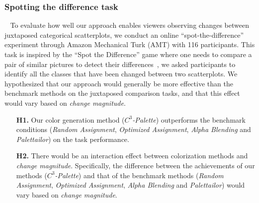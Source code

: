 {\subsubsection{Spotting the difference task}
\
\newline
To evaluate how well our approach enables viewers observing changes between juxtaposed categorical scatterplots, we conduct an online ``spot-the-difference'' experiment through Amazon Mechanical Turk (AMT) with 116 participants.
This task is inspired by the ``Spot the Difference'' game where one needs to compare a pair of similar pictures to detect their differences~\cite{Fukuba2009}, we asked participants to identify all the classes that have been changed between two scatterplots.
\vspace{.3em}
 We hypothesized that our approach would generally be more effective than the benchmark methods on the juxtaposed comparison tasks, and that this effect would vary based on \emph{change magnitude}.
\begin{itemize}[noitemsep]
\setlength{\itemsep}{5pt}
    \item[\textbf{H1.}] Our color generation method (\emph{$C^3$-Palette}) outperforms the benchmark conditions (\emph{Random Assignment}, \emph{Optimized Assignment}, \emph{Alpha Blending} and \emph{Palettailor}) on the task performance.


    \item [\textbf{H2.}] There would be an interaction effect between colorization methods and \emph{change magnitude}. Specifically, the difference between the achievements of our methods (\emph{$C^3$-Palette}) and that of the benchmark methods (\emph{Random Assignment}, \emph{Optimized Assignment}, \emph{Alpha Blending} and \emph{Palettailor}) would vary based on \emph{change magnitude}.
\end{itemize}

}
